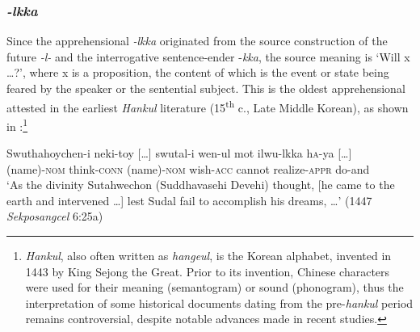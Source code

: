 \documentclass[output=paper,colorlinks,citecolor=brown]{langscibook}
\begin{document}
\subsubsection{\textit{-lkka}} 
Since the apprehensional \textit{-lkka} originated from the source construction of the future \textit{{}-l-} and the interrogative sentence-ender \nobreakdash-\textit{kka}, the source meaning is `Will x …?', where x is a proposition, the content of which is the event or state being feared by the speaker or the sentential subject. This is the oldest apprehensional attested in the earliest \textit{Hankul} literature (15\textsuperscript{th} c., Late Middle Korean), as shown in :\footnote{\textit{Hankul}, also often written as \textit{hangeul}, is the Korean alphabet, invented in 1443 by King Sejong the Great. Prior to its invention, Chinese characters were used for their meaning (semantogram) or sound (phonogram), thus the interpretation of some historical documents dating from the pre-\textit{hankul} period remains controversial, despite notable advances made in recent studies.}


\ea \label{ex:RK4}
\gll Swuthahoychen-i neki-toy \textup{[…]} swutal-i wen-ul mot ilwu-lkka h\textsc{a}-ya \textup{[…]} \\
(name)-\textsc{nom} think-\textsc{conn} {} (name)-\textsc{nom} wish-\textsc{acc} cannot realize-\textsc{appr} do-and \\
\glt `As the divinity Sutahwechon (Suddhavasehi Devehi) thought, [he came to the earth and intervened …] lest Sudal fail to accomplish his dreams,  …' (1447 \textit{Sekposangcel} 6:25a) \\
\z
\end{document}
